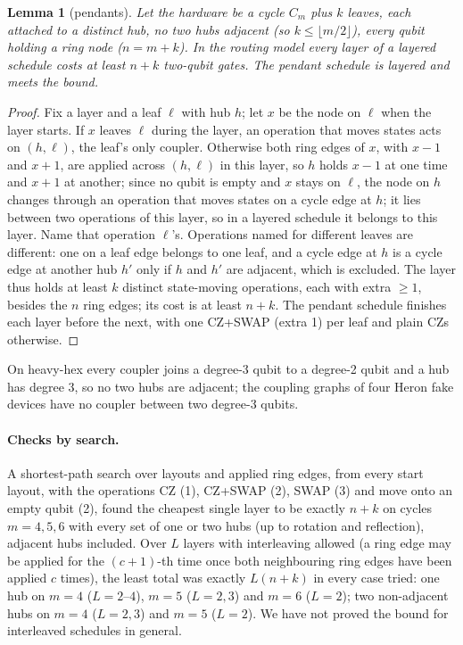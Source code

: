 \documentclass[11pt]{article}
\newtheorem{lemma}{Lemma}
\begin{document}
\begin{lemma}[pendants]
Let the hardware be a cycle $C_m$ plus $k$ leaves, each attached to a distinct hub, no two hubs adjacent (so
$k \le \lfloor m/2 \rfloor$), every
qubit holding a ring node ($n = m+k$). In the routing model every layer of a layered schedule costs at least $n + k$
two-qubit gates. The pendant schedule is layered and meets the bound.
\end{lemma}
\begin{proof}
Fix a layer and a leaf $\ell$ with hub $h$; let $x$ be the node on $\ell$ when the layer starts. If $x$ leaves $\ell$
during the layer, an operation that moves states acts on $(h,\ell)$, the leaf's only coupler. Otherwise both ring edges
of $x$, with $x-1$ and $x+1$, are applied across $(h,\ell)$ in this layer, so $h$ holds $x-1$ at one time and $x+1$ at
another; since no qubit is empty and $x$ stays on $\ell$, the node on $h$ changes through an operation that moves states
on a cycle edge at $h$; it lies between two operations of this layer, so in a layered schedule it belongs to this
layer. Name that operation $\ell$'s. Operations named for different leaves are different: one on a leaf
edge belongs to one leaf, and a cycle edge at $h$ is a cycle edge at another hub $h'$ only if $h$ and $h'$ are adjacent,
which is excluded. The layer thus holds at least $k$ distinct state-moving operations, each with extra $\ge 1$, besides
the $n$ ring edges; its cost is at least $n+k$. The pendant schedule finishes each layer before the next, with one
CZ+SWAP (extra 1) per leaf and plain CZs otherwise.
\end{proof}

On heavy-hex every coupler joins a degree-3 qubit to a degree-2 qubit and a hub has degree 3, so no two hubs are
adjacent; the coupling graphs of four Heron fake devices have no coupler between two degree-3 qubits.

\paragraph{Checks by search.} A shortest-path search over layouts and applied ring edges, from every start layout, with
the operations CZ (1), CZ+SWAP (2), SWAP (3) and move onto an empty qubit (2), found the cheapest single layer to be
exactly $n+k$ on cycles $m = 4, 5, 6$ with every set of one or two hubs (up to rotation and reflection), adjacent hubs included. Over
$L$ layers with interleaving allowed (a ring edge may be applied for the $(c+1)$-th time once both neighbouring ring edges
have been applied $c$ times), the least total was exactly $L(n+k)$ in every case tried: one hub on $m = 4$ ($L = 2$--$4$), $m = 5$ ($L = 2, 3$) and $m = 6$ ($L = 2$); two non-adjacent hubs on $m = 4$ ($L = 2, 3$) and $m = 5$ ($L = 2$). We have not proved the
bound for interleaved schedules in general.
\end{document}
